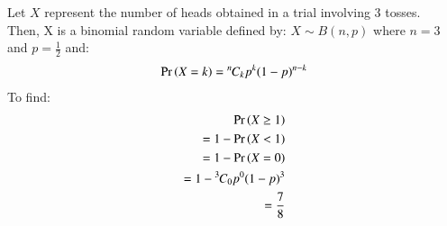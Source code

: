 
Let $X$ represent the number of heads obtained in a trial involving 3 tosses.\\
Then, X is a binomial random variable defined by: $X \sim B(n,p)$ where $n = 3$ and $p = \frac{1}{2}$ and:
\begin{align}
    \Pr\left(X = k\right) = {{}^{n}\mkern-1muC_{k}} p^k (1-p)^{n-k}
\end{align}
To find:
\begin{align}
    \Pr\left(X\geq 1\right)\\
    =1 - \Pr\left(X < 1\right)\\
    =1 - \Pr\left(X = 0\right)\\
    =1 - {{}^{3}\mkern-1muC_{0}}p^0(1-p)^3\\
    = \frac{7}{8}
    \end{align}
